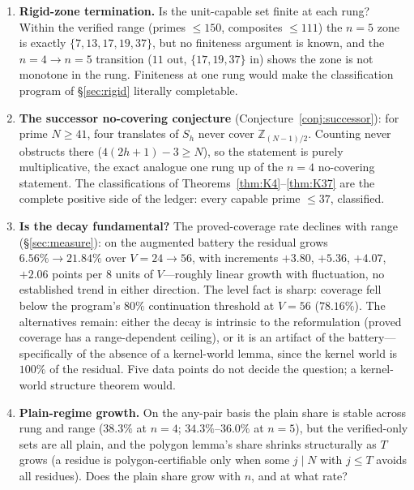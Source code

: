 \documentclass[11pt,a4paper]{article}
\numberwithin{equation}{section}
\theoremstyle{plain}
\theoremstyle{plain}
\theoremstyle{definition}
\theoremstyle{remark}
\newcommand{\Z}{\mathbb{Z}}
\begin{document}
\begin{enumerate}[leftmargin=1.7em,itemsep=4pt]
\item \textbf{Rigid-zone termination.} Is the unit-capable set finite at
  each rung? Within the verified range (primes $\le 150$, composites
  $\le 111$) the $n=5$ zone is exactly $\{7,13,17,19,37\}$, but no
  finiteness argument is known, and the $n=4\to n=5$ transition
  ($11$ out, $\{17,19,37\}$ in) shows the zone is not monotone in the
  rung. Finiteness at one rung would make the classification program of
  \S\ref{sec:rigid} literally completable.

\item \textbf{The successor no-covering conjecture}
  (Conjecture~\ref{conj:successor}): for prime $N\ge 41$, four
  translates of $S_h$ never cover $\Z_{(N-1)/2}$. Counting never
  obstructs there ($4(2h+1)-3\ge N$), so the statement is purely
  multiplicative, the exact analogue one rung up of the $n=4$
  no-covering statement. The classifications of
  Theorems~\ref{thm:K4}--\ref{thm:K37} are the complete positive side of
  the ledger: every capable prime $\le 37$, classified.

\item \textbf{Is the decay fundamental?} The proved-coverage rate
  declines with range (\S\ref{sec:measure}): on the augmented battery
  the residual grows $6.56\%\to21.84\%$ over $V=24\to56$, with
  increments $+3.80$, $+5.36$, $+4.07$, $+2.06$ points per $8$ units of
  $V$---roughly linear growth with fluctuation, no established trend in
  either direction. The level fact is sharp: coverage fell below the
  program's $80\%$ continuation threshold at $V=56$ ($78.16\%$). The
  alternatives remain: either the decay is intrinsic to the
  reformulation (proved coverage has a range-dependent ceiling), or it
  is an artifact of the battery---specifically of the absence of a
  kernel-world lemma, since the kernel world is $100\%$ of the residual.
  Five data points do not decide the question; a kernel-world structure
  theorem would.

\item \textbf{Plain-regime growth.} On the any-pair basis the plain share
  is stable across rung and range ($38.3\%$ at $n=4$; $34.3\%$--$36.0\%$
  at $n=5$), but the verified-only sets are all plain, and the
  polygon lemma's share shrinks structurally as $T$ grows (a residue is
  polygon-certifiable only when some $j\mid N$ with $j\le T$ avoids all
  residues). Does the plain share grow with $n$, and at what rate?


\end{enumerate}
\end{document}
